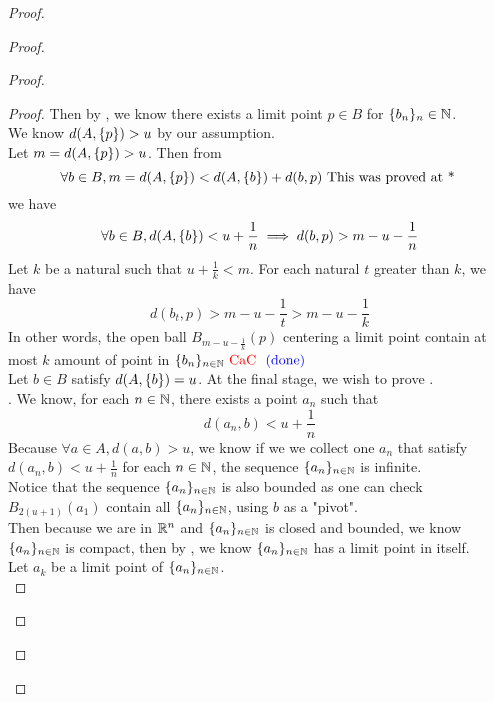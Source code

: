 \documentclass{report}
\begin{document}
\begin{proof}
\begin{proof}
\begin{proof}
\begin{proof}
Then by , we know there exists a limit point $p\in B$ for $\{ b_n \}_n\in\mathbb{N}$.\\

We know $d(A,\{ p \})>u$ by our assumption.\\

Let $m=d(A,\{ p \})>u$. Then from
\begin{equation}
\forall b\in B,m=d(A,\{ p \})<d(A,\{ b \})+d(b,p)\text{ This was proved at * }
\end{equation}
we have
\begin{equation}
\forall b\in B, d(A,\{ b \})<u+\frac{1}{n}\implies d(b,p)>m-u-\frac{1}{n}
\end{equation}
Let $k$ be a natural such that  $u+\frac{1}{k}<m$. For each natural $t$ greater than  $k$, we have 
\begin{equation}
d(b_t,p)>m-u-\frac{1}{t}>m-u-\frac{1}{k}
\end{equation}
In other words, the open ball $B_{m-u-\frac{1}{k}}(p)$ centering a limit point contain at most $k$ amount of point in  $\{ b_n \}_{n\in\mathbb{N}}\text{ \textcolor{red}{CaC} }\textcolor{blue}{\text{ (done) }}$\\

Let $b\in B$ satisfy $d(A,\{ b \})=u$. At the final stage, we wish to prove .\\

. We know, for each $n\in\mathbb{N}$, there exists a point $a_n$ such that 
\begin{equation}
d(a_n,b)<u+\frac{1}{n}
\end{equation}
Because $\forall a\in A, d(a,b)>u$, we know if we we collect one $a_n$ that satisfy  $d(a_n,b)<u+\frac{1}{n}$ for each $n\in\mathbb{N}$, the sequence $\{ a_n \}_{n\in\mathbb{N}}$ is infinite.\\

Notice that the sequence $\{ a_n \}_{n\in\mathbb{N}}$ is also bounded as one can check $B_{2(u+1)}(a_1)$ contain all $\{ a_n \}_{n\in\mathbb{N}}$, using $b$ as a "pivot".\\

Then because we are in $\mathbb{R}^n$ and $\{ a_n \}_{n\in\mathbb{N}}$ is closed and bounded, we know $\{ a_n \}_{n\in\mathbb{N}}$ is compact, then by , we know $\{ a_n \}_{n\in\mathbb{N}}$ has a limit point in itself.\\

Let $a_k$ be a limit point of $\{ a_n \}_{n\in\mathbb{N}}$.\\


\end{proof}
\end{proof}
\end{proof}
\end{proof}
\end{document}
